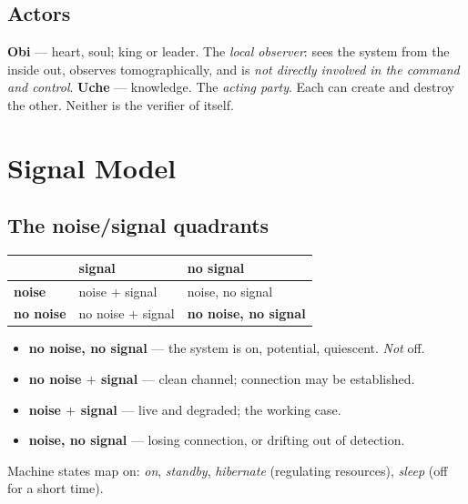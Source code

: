 \documentclass[11pt,a4paper]{article}
\begin{document}
\subsection{Actors}

\textbf{Obi} --- heart, soul; king or leader. The \emph{local observer}: sees
the system from the inside out, observes tomographically, and is \emph{not
directly involved in the command and control}. \textbf{Uche} --- knowledge. The
\emph{acting party}. Each can create and destroy the other. Neither is the
verifier of itself.

\section{Signal Model}

\subsection{The noise/signal quadrants}
\label{sec:quadrants}

\begin{center}
\begin{tabular}{@{}lll@{}}
\toprule
 & \textbf{signal} & \textbf{no signal} \\
\midrule
\textbf{noise}    & noise $+$ signal    & noise, no signal \\
\textbf{no noise} & no noise $+$ signal & \textbf{no noise, no signal} \\
\bottomrule
\end{tabular}
\end{center}

\begin{itemize}[leftmargin=*,noitemsep]
  \item \textbf{no noise, no signal} --- the system is on, potential,
    quiescent. \emph{Not} off.
  \item \textbf{no noise $+$ signal} --- clean channel; connection may be
    established.
  \item \textbf{noise $+$ signal} --- live and degraded; the working case.
  \item \textbf{noise, no signal} --- losing connection, or drifting out of
    detection.
\end{itemize}

Machine states map on: \emph{on}, \emph{standby}, \emph{hibernate} (regulating
resources), \emph{sleep} (off for a short time).
\end{document}
